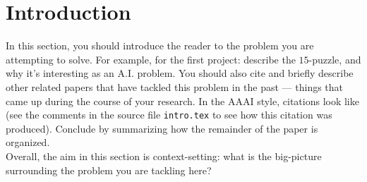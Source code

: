 
\section{Introduction}
\label{sec:intro}

In this section, you should introduce the reader to the problem you
are attempting to solve. For example, for the first project: describe
the $15$-puzzle, and why it's interesting as an A.I. problem. You
should also cite and briefly describe other related papers that have
tackled this problem in the past --- things that came up during the
course of your research. In the AAAI style, citations look like
\cite{aima} (see the comments in the source file \texttt{intro.tex} to
see how this citation was produced). Conclude by summarizing how the
remainder of the paper is organized. \\


Overall, the aim in this section is context-setting: what is the
big-picture surrounding the problem you are tackling here?


